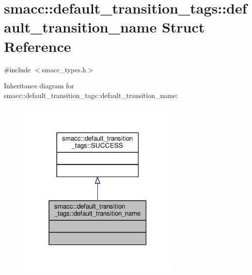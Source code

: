 \hypertarget{structsmacc_1_1default__transition__tags_1_1default__transition__name}{}\section{smacc\+:\+:default\+\_\+transition\+\_\+tags\+:\+:default\+\_\+transition\+\_\+name Struct Reference}
\label{structsmacc_1_1default__transition__tags_1_1default__transition__name}


{\ttfamily \#include $<$smacc\+\_\+types.\+h$>$}



Inheritance diagram for smacc\+:\+:default\+\_\+transition\+\_\+tags\+:\+:default\+\_\+transition\+\_\+name\+:\nopagebreak
\begin{figure}[H]
\begin{center}
\leavevmode
\includegraphics[width=230pt]{structsmacc_1_1default__transition__tags_1_1default__transition__name__inherit__graph}
\end{center}
\end{figure}


